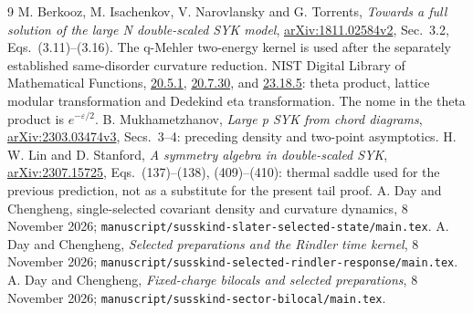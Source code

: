 \documentclass[11pt]{article}
\newcommand{\eps}{\varepsilon}
\begin{document}
\begin{thebibliography}{9}\small
{} M. Berkooz, M. Isachenkov, V. Narovlansky and
G. Torrents, \emph{Towards a full solution of the large N
double-scaled SYK model},
\href{https://arxiv.org/html/1811.02584v2}{arXiv:1811.02584v2},
Sec.~3.2, Eqs.~(3.11)--(3.16). The q-Mehler two-energy kernel is
used after the separately established same-disorder curvature reduction.
 NIST Digital Library of Mathematical Functions,
\href{https://dlmf.nist.gov/20.5.E1}{20.5.1},
\href{https://dlmf.nist.gov/20.7.E30}{20.7.30}, and
\href{https://dlmf.nist.gov/23.18.E5}{23.18.5}:
theta product, lattice modular transformation and Dedekind eta
transformation. The nome in the theta product is $e^{-\eps/2}$.
 B. Mukhametzhanov, \emph{Large p SYK from chord
diagrams}, \href{https://arxiv.org/html/2303.03474v3}{arXiv:2303.03474v3},
Secs.~3--4: preceding density and two-point asymptotics.
 H. W. Lin and D. Stanford, \emph{A symmetry algebra
in double-scaled SYK},
\href{https://arxiv.org/html/2307.15725}{arXiv:2307.15725},
Eqs.~(137)--(138), (409)--(410): thermal saddle used for the
previous prediction, not as a substitute for the present tail proof.
 A. Day and Chengheng, single-selected
covariant density and curvature dynamics, 8 November 2026;
\texttt{manuscript/susskind-slater-selected-state/main.tex}.
 A. Day and Chengheng, \emph{Selected
preparations and the Rindler time kernel}, 8 November 2026;
\texttt{manuscript/susskind-selected-rindler-response/main.tex}.
 A. Day and Chengheng, \emph{Fixed-charge
bilocals and selected preparations}, 8 November 2026;
\texttt{manuscript/susskind-sector-bilocal/main.tex}.
\end{thebibliography}
\end{document}
